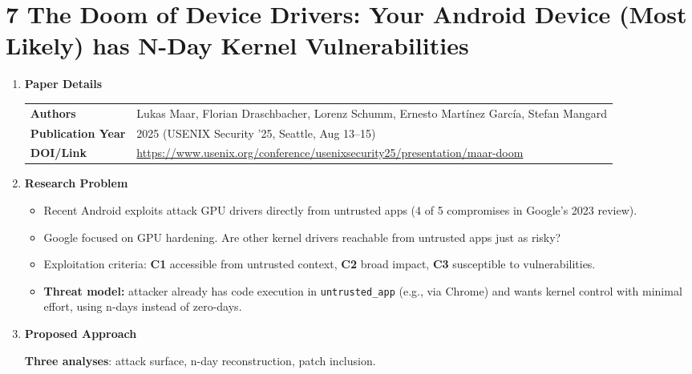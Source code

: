 \documentclass[11pt,a4paper]{article}
\newcommand{\entrypart}[1]{\textbf{\color{accent}#1}\par\vspace{2pt}}
\begin{document}
\newpage

\section{7 The Doom of Device Drivers: Your Android Device (Most Likely) has N-Day Kernel Vulnerabilities}

\begin{enumerate}

    \item \entrypart{Paper Details}

    \begin{tabular}{@{}>{\bfseries}p{3.2cm} p{11.5cm}@{}}
        Authors          & Lukas Maar, Florian Draschbacher, Lorenz Schumm, Ernesto Mart\'inez Garc\'ia, Stefan Mangard \\[2pt]
        Publication Year & 2025 (USENIX Security '25, Seattle, Aug 13--15) \\[2pt]
        DOI/Link         & \url{https://www.usenix.org/conference/usenixsecurity25/presentation/maar-doom}
    \end{tabular}

    \item \entrypart{Research Problem}

    \begin{itemize}
        \item Recent Android exploits attack GPU drivers directly from untrusted apps (4 of 5 compromises in Google's 2023 review).
        \item Google focused on GPU hardening. Are other kernel drivers reachable from untrusted apps just as risky?
        \item Exploitation criteria: \textbf{C1} accessible from untrusted context, \textbf{C2} broad impact, \textbf{C3} susceptible to vulnerabilities.
        \item \textbf{Threat model:} attacker already has code execution in \texttt{untrusted\_app} (e.g., via Chrome) and wants kernel control with minimal effort, using n-days instead of zero-days.
    \end{itemize}

    \item \entrypart{Proposed Approach}

    \textbf{Three analyses}: attack surface, n-day reconstruction, patch inclusion.


\end{enumerate}
\end{document}
